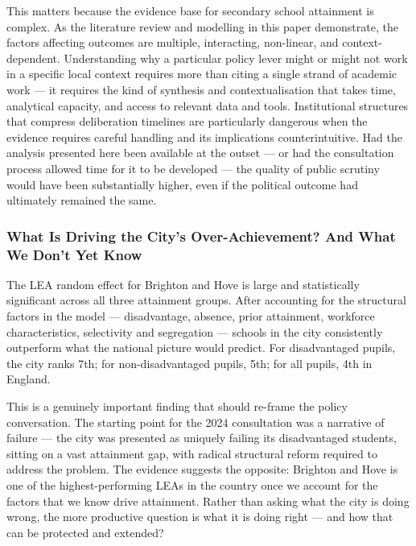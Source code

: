 \documentclass[
  11pt,
]{article}
\begin{document}
This matters because the evidence base for secondary school attainment
is complex. As the literature review and modelling in this paper
demonstrate, the factors affecting outcomes are multiple, interacting,
non-linear, and context-dependent. Understanding why a particular policy
lever might or might not work in a specific local context requires more
than citing a single strand of academic work --- it requires the kind of
synthesis and contextualisation that takes time, analytical capacity,
and access to relevant data and tools. Institutional structures that
compress deliberation timelines are particularly dangerous when the
evidence requires careful handling and its implications
counterintuitive. Had the analysis presented here been available at the
outset --- or had the consultation process allowed time for it to be
developed --- the quality of public scrutiny would have been
substantially higher, even if the political outcome had ultimately
remained the same.

\subsubsection{What Is Driving the City's Over-Achievement? And What We
Don't Yet
Know}\label{what-is-driving-the-citys-over-achievement-and-what-we-dont-yet-know}

The LEA random effect for Brighton and Hove is large and statistically
significant across all three attainment groups. After accounting for the
structural factors in the model --- disadvantage, absence, prior
attainment, workforce characteristics, selectivity and segregation ---
schools in the city consistently outperform what the national picture
would predict. For disadvantaged pupils, the city ranks 7th; for
non-disadvantaged pupils, 5th; for all pupils, 4th in England.

This is a genuinely important finding that should re-frame the policy
conversation. The starting point for the 2024 consultation was a
narrative of failure --- the city was presented as uniquely failing its
disadvantaged students, sitting on a vast attainment gap, with radical
structural reform required to address the problem. The evidence suggests
the opposite: Brighton and Hove is one of the highest-performing LEAs in
the country once we account for the factors that we know drive
attainment. Rather than asking what the city is doing wrong, the more
productive question is what it is doing right --- and how that can be
protected and extended?
\end{document}

